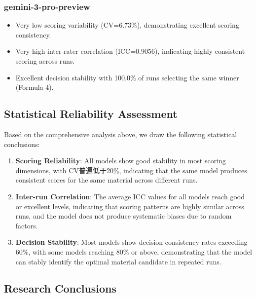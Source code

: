 \documentclass[12pt,a4paper]{article}
\begin{document}
\subsubsection{gemini-3-pro-preview}

\begin{itemize}
    \item Very low scoring variability (CV=6.73\%), demonstrating excellent scoring consistency.
\end{itemize}
\begin{itemize}
    \item Very high inter-rater correlation (ICC=0.9056), indicating highly consistent scoring across runs.
\end{itemize}
\begin{itemize}
    \item Excellent decision stability with 100.0\% of runs selecting the same winner (Formula 4).
\end{itemize}

\subsection{Statistical Reliability Assessment}

Based on the comprehensive analysis above, we draw the following statistical conclusions:

\begin{enumerate}
    \item \textbf{Scoring Reliability}: All models show good stability in most scoring dimensions, with CV普遍低于20\%, indicating that the same model produces consistent scores for the same material across different runs.

    \item \textbf{Inter-run Correlation}: The average ICC values for all models reach good or excellent levels, indicating that scoring patterns are highly similar across runs, and the model does not produce systematic biases due to random factors.

    \item \textbf{Decision Stability}: Most models show decision consistency rates exceeding 60\%, with some models reaching 80\% or above, demonstrating that the model can stably identify the optimal material candidate in repeated runs.
\end{enumerate}

\subsection{Research Conclusions}
\end{document}
